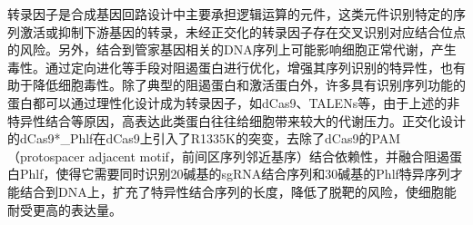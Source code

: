 \documentclass[b5paper,9pt,oneolumn,twoside,UTF8]{article}
\begin{document}
\indent 转录因子是合成基因回路设计中主要承担逻辑运算的元件，这类元件识别特定的序列激活或抑制下游基因的转录，未经正交化的转录因子存在交叉识别对应结合位点的风险。另外，结合到管家基因相关的DNA序列上可能影响细胞正常代谢，产生毒性。通过定向进化等手段对阻遏蛋白进行优化，增强其序列识别的特异性，也有助于降低细胞毒性\cite{Meyer2018}。除了典型的阻遏蛋白和激活蛋白外，许多具有识别序列功能的蛋白都可以通过理性化设计成为转录因子，如dCas9、TALENs等，由于上述的非特异性结合等原因，高表达此类蛋白往往给细胞带来较大的代谢压力。正交化设计的dCas9*\_Phlf在dCas9上引入了R1335K的突变，去除了dCas9的PAM（protospacer adjacent motif，前间区序列邻近基序）结合依赖性，并融合阻遏蛋白Phlf，使得它需要同时识别20碱基的sgRNA结合序列和30碱基的Phlf特异序列才能结合到DNA上，扩充了特异性结合序列的长度，降低了脱靶的风险，使细胞能耐受更高的表达量\cite{Zhang2018b}。
\end{document}
